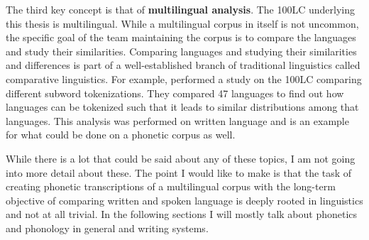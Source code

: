 The third key concept is that of \textbf{multilingual analysis}. The 100LC underlying this thesis is multilingual. While a multilingual corpus in itself is not uncommon, the specific goal of the team maintaining the corpus is to compare the languages and study their similarities. Comparing languages and studying their similarities and differences is part of a well-established branch of traditional linguistics called comparative linguistics. For example, \citet{gutierrez-vasques-etal-2021-characters} performed a study on the 100LC comparing different subword tokenizations. They compared 47 languages to find out how languages can be tokenized such that it leads to similar distributions among that languages. This analysis was performed on written language and is an example for what could be done on a phonetic corpus as well.

While there is a lot that could be said about any of these topics, I am not going into more detail about these. The point I would like to make is that the task of creating phonetic transcriptions of a multilingual corpus with the long-term objective of comparing written and spoken language is deeply rooted in linguistics and not at all trivial. In the following sections I will mostly talk about phonetics and phonology in general and writing systems.

